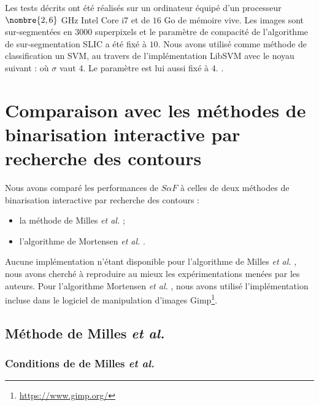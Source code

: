 \begin{emodif}
Les tests décrits ont été réalisés sur un ordinateur équipé d'un processeur $\nombre{2,6}$ GHz Intel Core i7 et de $16$ Go de mémoire vive. Les images sont sur-segmentées en $3000$ superpixels et le paramètre de compacité de l'algorithme de sur-segmentation SLIC a été fixé à $10$. Nous avons utilisé comme méthode de classification un SVM, au travers de l'implémentation LibSVM avec le noyau suivant :
où $\sigma$ vaut $4$. Le paramètre  est lui aussi fixé à $4$. .

\end{emodif}
\section{Comparaison avec les méthodes de binarisation interactive par recherche des contours}

Nous avons comparé les performances de $S \alpha F$ à celles de deux méthodes de binarisation interactive par recherche des contours : 
\begin{itemize}
\item la méthode de Milles \textit{et al.} \cite{mille2015combination} ;
\item l'algorithme de Mortensen \textit{et al.} \cite{mortensen1995intelligent}.
\end{itemize}

Aucune implémentation n'étant disponible pour l'algorithme de Milles \textit{et al.} \cite{mille2015combination}, nous avons cherché à reproduire au mieux les expérimentations menées par les auteurs.  Pour l'algorithme  Mortensen \textit{et al.} \cite{mortensen1995intelligent}, nous avons utilisé l'implémentation incluse dans le logiciel de manipulation d'images Gimp\footnote{\url{https://www.gimp.org/}}.

\subsection{Méthode de Milles \textit{et al.} }

\subsubsection{Conditions de  de Milles \textit{et al.}}

